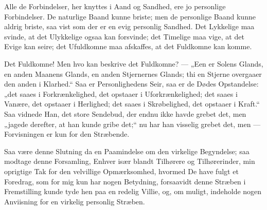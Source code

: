 \documentclass[12pt,a4paper]{book}
\newcommand{\apage}[1]{\marginnote{\footnotesize\textit{[#1]}}}
\begin{document}
Alle de Forbindelser, her knyttes i Aand og Sandhed, ere jo
personlige Forbindelser. De naturlige Baand kunne briste; men de
personlige Baand kunne aldrig briste, saa vist som der er en evig
personlig Sandhed. Det Lykkelige maa svinde, at det Ulykkelige
ogsaa kan forsvinde; det Timelige maa vige, at det Evige kan seire;
det Ufuldkomne maa afskaffes, at det Fuldkomne kan komme.

Det Fuldkomne! Men hvo kan beskrive det Fuldkomne? --- „Een er
Solens Glands, en anden Maanens Glands, en anden Stjernernes
Glands; thi en Stjerne overgaaer den anden i Klarhed.“ Saa er
Personlighedens Seir, saa er de Dødes Opstandelse: „det saaes i
Forkrænkelighed, det opstaaer i Uforkrænkelighed; det saaes i
Vanære, det opstaaer i Herlighed; det saaes i Skrøbelighed, det
opstaaer i Kraft.“ Saa vidnede Han, det store Sendebud, der endnu
ikke havde grebet det, men „jagede derefter, at han kunde gribe
det;“ nu har han visselig grebet det, men --- Forvisningen er kun for
den Stræbende.

Saa være denne Slutning da en Paamindelse om den virkelige
Begyndelse; saa modtage denne Forsamling, Enhver
især blandt Tilhørere og Tilhørerinder, min oprigtige Tak for \apage{144} den
velvillige Opmærksomhed, hvormed De have fulgt et Foredrag, som
for mig kun har nogen Betydning, forsaavidt denne Stræben i
Fremstilling kunde tyde hen paa en redelig Villie, og, om muligt,
indeholde nogen Anviisning for en virkelig personlig Stræben.

\end{document}
